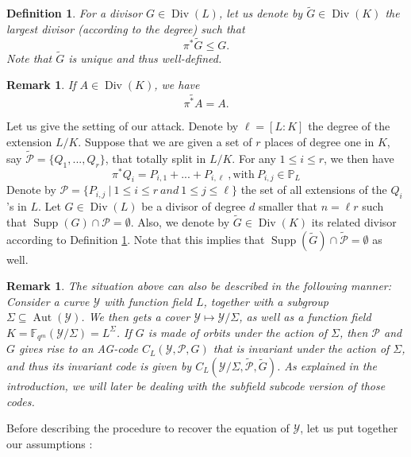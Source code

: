 \documentclass[10pt]{article}
\newtheorem{def1}[thm]{Definition}
\newtheorem{rq1}[thm]{Remark}
\newcommand{\s}{\vspace{0.3cm}}
\newcommand{\PP}{\mathbb{P}}
\newcommand{\fqm}{\mathbb{F}_{q^m}}
\newcommand{\su}{\subseteq}
\newcommand{\Y}{\mathcal{Y}}
\newcommand{\PR}{\mathcal{P}}
\newcommand{\Div}{\operatorname{Div}}
\newcommand{\Supp}{\operatorname{Supp}}
\newcommand{\Aut}{\operatorname{Aut}}
\newcommand{\hugues}[1]{\textcolor{blue}{#1}}
\newcommand{\notehugues}[1]{\marginpar{\small\hugues{#1}}}
\begin{document}
\s

\begin{def1} \label{pousséavant}
For a divisor $G \in \Div(L)$, let us denote by $\tilde{G} \in \Div(K)$ the largest divisor (according to the degree) such that
\[\pi^*\tilde{G} \leq G.\]
Note that $\tilde{G}$ is unique and thus well-defined.\notehugues{compatibilité avec Prop.~\ref{invrr}~?}
\end{def1} 

\s 

\begin{rq1} \label{jsp}
If $A \in \Div(K)$, we have 
\[\widetilde{\pi^*A}=A.\]
\end{rq1}

\s

Let us give the setting of our attack. Denote by $\ell=[L:K]$ the degree of the extension $L/K$. Suppose that we are given a set of $r$ places of degree one in $K$, say $\tilde{\PR} = \{Q_1,...,Q_r\}$, that totally split in $L/K$. For any $1 \leq i \leq r$, we then have
\notehugues{notation déroutante d'avoir les $Q$ dans $K$ et les $P$ dans $L$} 
\[\pi^*Q_i = P_{i,1} + ... + P_{i,\ell} \ , \textrm{with}  \ P_{i,j} \in \PP_L\]
Denote by $\PR = \{P_{i,j} \ | \ 1 \leq i \leq r \ and \ 1 \leq j \leq \ell\}$ the set of all extensions of the $Q_i$'s in $L$. Let $G \in \Div(L)$ be a divisor of degree $d$ smaller that $n=\ell r$ such that $\Supp(G) \cap \PR = \emptyset$. Also, we denote by $\tilde{G} \in \Div(K)$ its related divisor according to Definition \ref{pousséavant}.
Note that this implies that $\Supp(\tilde{G}) \cap \tilde{\PR} = \emptyset$ as well. 

\s

\begin{rq1} \rm
The situation above can also be described in the following manner:
\notehugues{cas galoisien uniquement~?}
Consider a curve $\Y$ with function field $L$, together with a subgroup $\Sigma \su \Aut(\Y)$. We then gets a cover $\Y \longmapsto \Y/\Sigma$, as well as a function field $K = \fqm(\Y/\Sigma) = L^{\Sigma}$. If $G$ is made of orbits under the action of $\Sigma$, then $\PR$ and $G$ gives rise to an AG-code $C_L(\Y,\PR,G)$ that is invariant under the action of $\Sigma$, and thus its invariant code is given by $C_L(\Y/\Sigma,\tilde{\PR},\tilde{G})$. As explained in the introduction, we will later be dealing with the subfield subcode version of those codes.  
\end{rq1}

\s

Before describing the procedure to recover the equation of $\Y$, let us put together our assumptions :
\end{document}
